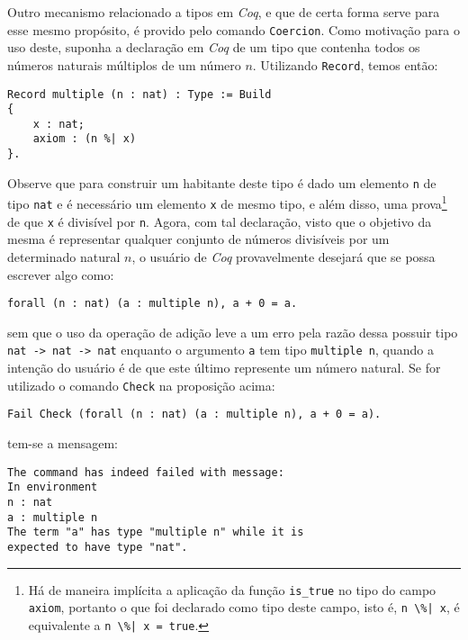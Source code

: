 Outro mecanismo relacionado a tipos em \textit{Coq}, e que de certa forma serve para esse mesmo propósito, é provido pelo comando \lstinline[language = coq]$Coercion$. Como motivação para o uso deste, suponha a declaração em \textit{Coq} de um tipo que contenha todos os números naturais múltiplos de um número $n$. Utilizando \lstinline[language = coq]$Record$, temos então: 
    \begin{lstlisting}[language = coq,frame=single,tabsize=1]
Record multiple (n : nat) : Type := Build
{       
    x : nat;
    axiom : (n %| x)        
}.
    \end{lstlisting}
Observe que para construir um habitante deste tipo é dado um elemento \lstinline[language = coq]$n$ de tipo \lstinline[language = coq]$nat$ e é necessário um elemento \lstinline[language = coq]$x$ de mesmo tipo, e além disso, uma prova\footnote{Há de maneira implícita a aplicação da função \lstinline[language = coq]$is_true$ no tipo do campo \lstinline[language = coq]$axiom$, portanto o que foi declarado como tipo deste campo, isto é, \lstinline[language = coq]$n \%| x$, é equivalente a \lstinline[language = coq]$n \%| x = true$.} de que \lstinline[language = coq]$x$ é divisível por \lstinline[language = coq]$n$.
Agora, com tal declaração, visto que o objetivo da mesma é representar qualquer conjunto de números divisíveis por um determinado natural $n$, o usuário de \textit{Coq} provavelmente desejará que se possa escrever algo como:
    \begin{lstlisting}[language = coq,frame=single,tabsize=1]
forall (n : nat) (a : multiple n), a + 0 = a.
    \end{lstlisting}
sem que o uso da operação de adição leve a um erro pela razão dessa possuir tipo \lstinline[language = coq]$nat -> nat -> nat$ enquanto o argumento \lstinline[language = coq]$a$ tem tipo \lstinline[language = coq]$multiple n$, quando a intenção do usuário é de que este último represente um número natural. Se for utilizado o comando \lstinline[language = coq]$Check$ na proposição acima:
    \begin{lstlisting}[language = coq,frame=single,tabsize=1]
Fail Check (forall (n : nat) (a : multiple n), a + 0 = a).
    \end{lstlisting}
tem-se a mensagem:
    \begin{lstlisting}[language = coq-error,frame=single,tabsize=1]
The command has indeed failed with message:
In environment
n : nat
a : multiple n
The term "a" has type "multiple n" while it is
expected to have type "nat".
    \end{lstlisting}
